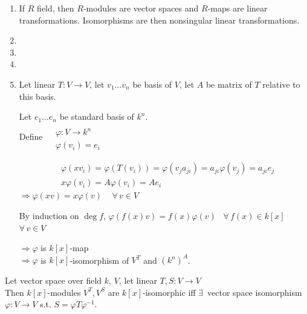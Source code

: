 \begin{enumerate}
	\item[(i)] If $R$ field, then $R$-modules are vector spaces and $R$-maps are linear transformations.  Isomorphisms are then nonsingular linear transformations.  
	\item[(ii)] 
	\item[(iii)]
	\item[(iv)]
	\item[(v)] Let linear $T:V \to V$, let $v_1 \dots v_n$ be basis of $V$, let $A$ be matrix of $T$ relative to this basis.  
	
	Let $e_1 \dots e_n$ be standard basis of $k^n$.  \\
	Define $\begin{aligned} & \quad \\
	& \varphi : V \to k^n \\
	& \varphi(v_i) = e_i \end{aligned}$
	
	\[
	\begin{aligned}
	& \varphi(xv_i) = \varphi(T(v_i)) = \varphi(v_j a_{ji} ) = a_{ji} \varphi(v_j) = a_{ji}e_j \\
	& x\varphi(v_i) = A\varphi(v_i) = Ae_i
	\end{aligned}
	\]
	$\Longrightarrow \varphi(xv) = x\varphi(v) \quad \, \forall \, v \in V$
	
	By induction on $\deg{f}$, $\varphi(f(x)v) = f(x) \varphi(v)$ \quad \, $\forall \, f(x) \in k[x]$ \quad \, $\forall \, v \in V$ 
	
	$\Longrightarrow \varphi$ is $k[x]$-map \\
	$\Longrightarrow \varphi$ is $k[x]$-isomorphism of $V^T$ and $(k^n)^A$.  
	
\end{enumerate}


\begin{proposition}\label{agat:Prop:kxmoduleisomorphism}
	Let vector space over field $k$, $V$, let linear $T,S : V \to V$ \\
	Then $k[x]$-modules $V^T, V^S$ are $k[x]$-isomorphic iff $\exists \, $ vector space isomorphism $\varphi : V \to V$ s.t. $S = \varphi T \varphi^{-1}$.  
\end{proposition}

